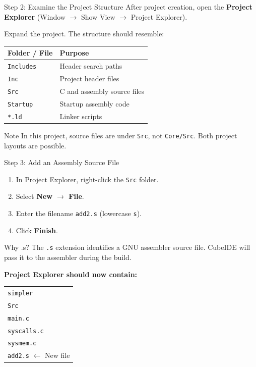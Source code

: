 \documentclass[9pt,aspectratio=169,xcolor=table]{beamer}
\begin{document}
\begin{frame}{Step 2: Examine the Project Structure}
	After project creation, open the \textbf{Project Explorer}
	(Window $\rightarrow$ Show View $\rightarrow$ Project Explorer).

	Expand the project. The structure should resemble:

	\begin{center}
		\begin{tabular}{ll}
			\textbf{Folder / File} & \textbf{Purpose} \\
			\hline
			\texttt{Includes} & Header search paths \\
			\texttt{Inc} & Project header files \\
			\texttt{Src} & C and assembly source files \\
			\texttt{Startup} & Startup assembly code \\
			\texttt{*.ld} & Linker scripts \\
		\end{tabular}
	\end{center}

	\begin{alertblock}{Note}
		In this project, source files are under \texttt{Src},
		not \texttt{Core/Src}. Both project layouts are possible.
	\end{alertblock}
\end{frame}


\begin{frame}{Step 3: Add an Assembly Source File}
	\begin{enumerate}
		\item In Project Explorer, right-click the \texttt{Src}
		folder.
		\item Select \textbf{New $\rightarrow$ File}.
		\item Enter the filename \texttt{add2.s}
		(lowercase \texttt{s}).
		\item Click \textbf{Finish}.
	\end{enumerate}

	\begin{block}{Why .s?}
		The \texttt{.s} extension identifies a GNU assembler
		source file. CubeIDE will pass it to the assembler
		during the build.
	\end{block}

	\textbf{Project Explorer should now contain:}

	\begin{center}
		\begin{tabular}{l}
			\texttt{simpler} \\
			\quad \texttt{Src} \\
			\qquad \texttt{main.c} \\
			\qquad \texttt{syscalls.c} \\
			\qquad \texttt{sysmem.c} \\
			\qquad \texttt{add2.s} \quad $\leftarrow$ New file
		\end{tabular}
	\end{center}
\end{frame}
\end{document}
